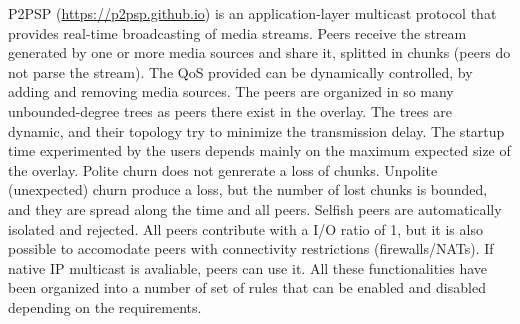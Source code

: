 

P2PSP (\url{https://p2psp.github.io}) is an application-layer
multicast protocol that provides real-time broadcasting of media
streams. Peers receive the stream generated by one or more media
sources and share it, splitted in chunks (peers do not parse the
stream). The QoS provided can be dynamically controlled, by adding and
removing media sources. The peers are organized in so many
unbounded-degree trees as peers there exist in the overlay. The trees
are dynamic, and their topology try to minimize the transmission
delay. The startup time experimented by the users depends mainly on
the maximum expected size of the overlay. Polite churn does not
genrerate a loss of chunks. Unpolite (unexpected) churn produce a
loss, but the number of lost chunks is bounded, and they are spread
along the time and all peers. Selfish peers are automatically isolated
and rejected. All peers contribute with a I/O ratio of 1, but it is
also possible to accomodate peers with connectivity restrictions
(firewalls/NATs). If native IP multicast is avaliable, peers can use
it. All these functionalities have been organized into a number of set
of rules that can be enabled and disabled depending on the
requirements.
